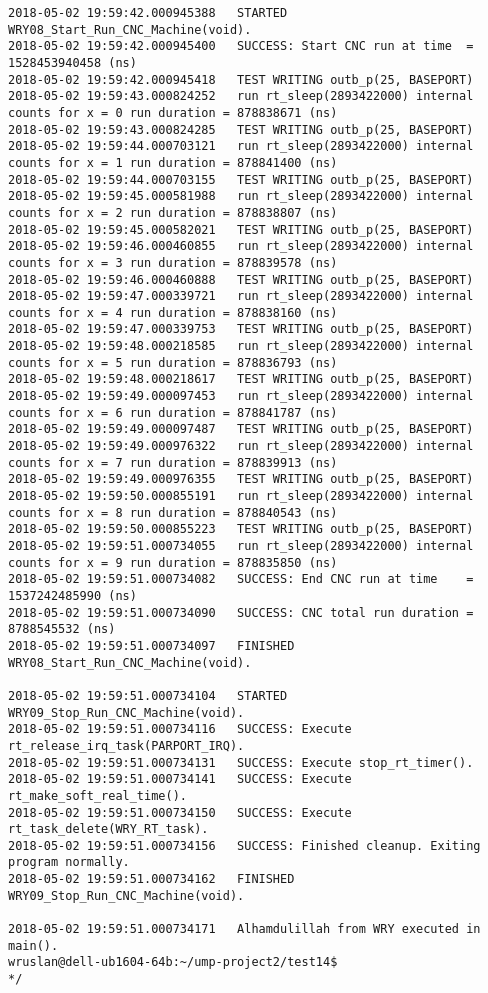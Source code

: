 \begin{lstlisting}[caption={App4-Full execution C/C++ code for Real Time (RTAI)}, label=App4-Full execution C/C++ code for Real Time (RTAI)]
2018-05-02 19:59:42.000945388 	STARTED  WRY08_Start_Run_CNC_Machine(void).
2018-05-02 19:59:42.000945400 	SUCCESS: Start CNC run at time 	= 1528453940458 (ns)
2018-05-02 19:59:42.000945418 	TEST WRITING outb_p(25, BASEPORT) 
2018-05-02 19:59:43.000824252 	run rt_sleep(2893422000) internal counts for x = 0 run duration = 878838671 (ns)
2018-05-02 19:59:43.000824285 	TEST WRITING outb_p(25, BASEPORT) 
2018-05-02 19:59:44.000703121 	run rt_sleep(2893422000) internal counts for x = 1 run duration = 878841400 (ns)
2018-05-02 19:59:44.000703155 	TEST WRITING outb_p(25, BASEPORT) 
2018-05-02 19:59:45.000581988 	run rt_sleep(2893422000) internal counts for x = 2 run duration = 878838807 (ns)
2018-05-02 19:59:45.000582021 	TEST WRITING outb_p(25, BASEPORT) 
2018-05-02 19:59:46.000460855 	run rt_sleep(2893422000) internal counts for x = 3 run duration = 878839578 (ns)
2018-05-02 19:59:46.000460888 	TEST WRITING outb_p(25, BASEPORT) 
2018-05-02 19:59:47.000339721 	run rt_sleep(2893422000) internal counts for x = 4 run duration = 878838160 (ns)
2018-05-02 19:59:47.000339753 	TEST WRITING outb_p(25, BASEPORT) 
2018-05-02 19:59:48.000218585 	run rt_sleep(2893422000) internal counts for x = 5 run duration = 878836793 (ns)
2018-05-02 19:59:48.000218617 	TEST WRITING outb_p(25, BASEPORT) 
2018-05-02 19:59:49.000097453 	run rt_sleep(2893422000) internal counts for x = 6 run duration = 878841787 (ns)
2018-05-02 19:59:49.000097487 	TEST WRITING outb_p(25, BASEPORT) 
2018-05-02 19:59:49.000976322 	run rt_sleep(2893422000) internal counts for x = 7 run duration = 878839913 (ns)
2018-05-02 19:59:49.000976355 	TEST WRITING outb_p(25, BASEPORT) 
2018-05-02 19:59:50.000855191 	run rt_sleep(2893422000) internal counts for x = 8 run duration = 878840543 (ns)
2018-05-02 19:59:50.000855223 	TEST WRITING outb_p(25, BASEPORT) 
2018-05-02 19:59:51.000734055 	run rt_sleep(2893422000) internal counts for x = 9 run duration = 878835850 (ns)
2018-05-02 19:59:51.000734082 	SUCCESS: End CNC run at time 	= 1537242485990 (ns)
2018-05-02 19:59:51.000734090 	SUCCESS: CNC total run duration	= 8788545532 (ns)
2018-05-02 19:59:51.000734097 	FINISHED WRY08_Start_Run_CNC_Machine(void).

2018-05-02 19:59:51.000734104 	STARTED  WRY09_Stop_Run_CNC_Machine(void).
2018-05-02 19:59:51.000734116 	SUCCESS: Execute rt_release_irq_task(PARPORT_IRQ).
2018-05-02 19:59:51.000734131 	SUCCESS: Execute stop_rt_timer().
2018-05-02 19:59:51.000734141 	SUCCESS: Execute rt_make_soft_real_time().
2018-05-02 19:59:51.000734150 	SUCCESS: Execute rt_task_delete(WRY_RT_task).
2018-05-02 19:59:51.000734156 	SUCCESS: Finished cleanup. Exiting program normally.
2018-05-02 19:59:51.000734162 	FINISHED WRY09_Stop_Run_CNC_Machine(void).

2018-05-02 19:59:51.000734171 	Alhamdulillah from WRY executed in main().
wruslan@dell-ub1604-64b:~/ump-project2/test14$ 
*/
\end{lstlisting}


